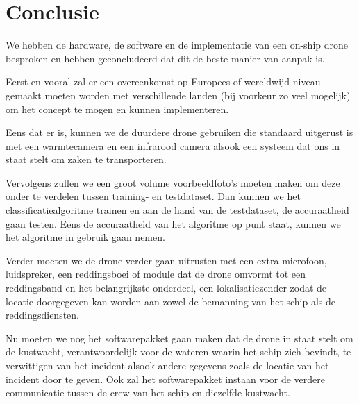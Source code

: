 
\chapter{Conclusie}
\label{ch:conclusie}


We hebben de hardware, de software en de implementatie van een on-ship drone besproken en hebben geconcludeerd dat dit de beste manier van aanpak is. 

Eerst en vooral zal er een overeenkomst op Europees of wereldwijd niveau gemaakt moeten worden met verschillende landen (bij voorkeur zo veel mogelijk) om het concept te mogen en kunnen implementeren. 

Eens dat er is, kunnen we de duurdere drone gebruiken die standaard uitgerust is met een warmtecamera en een infrarood camera alsook een systeem dat ons in staat stelt om zaken te transporteren. 

Vervolgens zullen we een groot volume voorbeeldfoto's moeten maken om deze onder te verdelen tussen training- en testdataset. Dan kunnen we het classificatiealgoritme trainen en aan de hand van de testdataset, de accuraatheid gaan testen. Eens de accuraatheid van het algoritme op punt staat, kunnen we het algoritme in gebruik gaan nemen. 

Verder moeten we de drone verder gaan uitrusten met een extra microfoon, luidspreker, een reddingsboei of module dat de drone omvormt tot een reddingsband en het belangrijkste onderdeel, een lokalisatiezender zodat de locatie doorgegeven kan worden aan zowel de bemanning van het schip als de reddingsdiensten. 

Nu moeten we nog het softwarepakket gaan maken dat de drone in staat stelt om de kustwacht, verantwoordelijk voor de wateren waarin het schip zich bevindt, te verwittigen van het incident alsook andere gegevens zoals de locatie van het incident door te geven. Ook zal het softwarepakket instaan voor de verdere communicatie tussen de crew van het schip en diezelfde kustwacht.

